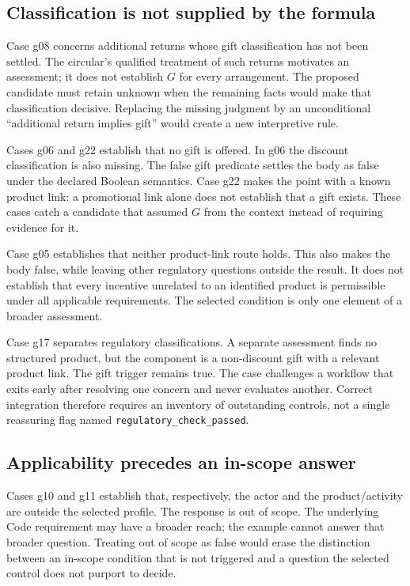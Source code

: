 
\subsection{Classification is not supplied by the formula}
Case g08 concerns additional returns whose gift classification has not been
settled. The circular's qualified treatment of such returns motivates an
assessment; it does not establish $G$ for every arrangement. The proposed
candidate must retain unknown when the remaining facts would make that
classification decisive. Replacing the missing judgment by an unconditional
``additional return implies gift'' would create a new interpretive rule.

Cases g06 and g22 establish that no gift is offered. In g06 the discount
classification is also missing. The false gift predicate settles the body as
false under the declared Boolean semantics. Case g22 makes the point with a
known product link: a promotional link alone does not establish that a gift
exists. These cases catch a candidate that assumed $G$ from the context instead
of requiring evidence for it.

Case g05 establishes that neither product-link route holds. This also makes the
body false, while leaving other regulatory questions outside the result. It
does not establish that every incentive unrelated to an identified product is
permissible under all applicable requirements. The selected condition is only
one element of a broader assessment.

Case g17 separates regulatory classifications. A separate assessment finds no
structured product, but the component is a non-discount gift with a relevant
product link. The gift trigger remains true. The case challenges a workflow
that exits early after resolving one concern and never evaluates another.
Correct integration therefore requires an inventory of outstanding controls,
not a single reassuring flag named \texttt{regulatory\_check\_passed}.

\subsection{Applicability precedes an in-scope answer}
Cases g10 and g11 establish that, respectively, the actor and the product/activity
are outside the selected profile. The response is out of scope. The underlying
Code requirement may have a broader reach; the example cannot answer that
broader question. Treating out of scope as false would erase the distinction
between an in-scope condition that is not triggered and a question the selected
control does not purport to decide.


